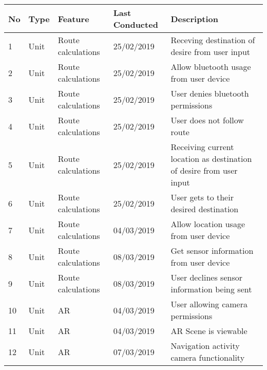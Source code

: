 \usepackage{rotating}
\usepackage{colortbl,booktabs}
\usepackage[paper=portrait,pagesize]{typearea}
\usepackage[a4paper, total={6in, 8in}]{geometry}
\usepackage{ulem}
\newpage
{}
\begin{turn}{-0}
\begin{tabular}{ | l | l | l | l | l |}
\hline
	\textbf{No} & \textbf{Type} & \textbf{Feature} & \textbf{Last Conducted} & \textbf{Description}\\ \hline
	
	1 & Unit & Route calculations & 25/02/2019 & Receving destination of desire from user input\\ \hline
	
	2 & Unit & Route calculations &25/02/2019& Allow bluetooth usage from user device\\ \hline
	
	3 & Unit & Route calculations &25/02/2019 & User denies bluetooth permissions\\ \hline
	
	4 & Unit & Route calculations & 25/02/2019& User does not follow route\\ \hline
	
	5 & Unit & Route calculations & 25/02/2019 & Receiving current location as destination of desire from user input\\ \hline
	
	6 & Unit & Route calculations & 25/02/2019 & User gets to their desired destination\\ \hline
	
	7 & Unit & Route calculations & 04/03/2019& Allow location usage from user device  \\ \hline
	
	8 & Unit & Route calculations & 08/03/2019 & Get sensor information from user device\\ \hline
	
	9 & Unit & Route calculations & 08/03/2019 & User declines sensor information being sent\\ \hline
	
	10 & Unit & AR & 04/03/2019& User allowing camera permissions \\ \hline
	
	11 & Unit & AR & 04/03/2019& AR Scene is viewable \\ \hline
	
	12 & Unit & AR & 07/03/2019 & Navigation activity camera functionality \\ \hline
	

\end{tabular}
\end{turn}
